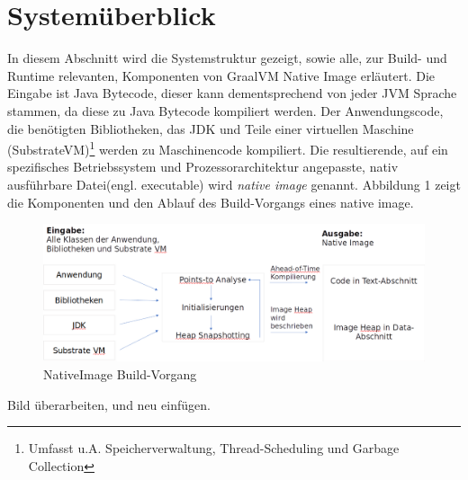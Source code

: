 \section{Systemüberblick}
\label{sec:system}
In diesem Abschnitt wird die Systemstruktur gezeigt, sowie alle, zur Build- und Runtime relevanten, Komponenten von GraalVM Native Image erläutert.
Die Eingabe ist Java Bytecode, dieser kann dementsprechend von jeder JVM Sprache stammen, da diese zu Java Bytecode kompiliert werden. 
Der Anwendungscode, die benötigten Bibliotheken, das JDK und Teile einer virtuellen Maschine (SubstrateVM)\footnote{Umfasst u.A. Speicherverwaltung, Thread-Scheduling und Garbage Collection} 
werden zu Maschinencode kompiliert. Die resultierende, auf ein spezifisches Betriebssystem und Prozessorarchitektur angepasste, nativ ausführbare Datei(engl. executable) wird \textit{native image} genannt. Abbildung 1 zeigt die Komponenten und den Ablauf des Build-Vorgangs eines native image.

\begin{figure}[ht]
	\centering
	\includegraphics[width=1\textwidth]{resources/GraalVM_BuildTime.png}
	\caption{NativeImage Build-Vorgang}
	\label{fig:system_buildtime}
\end{figure}

\begin{todo}
	Bild überarbeiten, und neu einfügen.
\end{todo}

